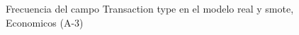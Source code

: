 \begin{figure}[H]
    \centering
    
    \caption{Frecuencia del campo Transaction type en el modelo real y smote, Economicos (A-3)}
    \label{frecuency-Transaction Type-smote-enc}
\end{figure}